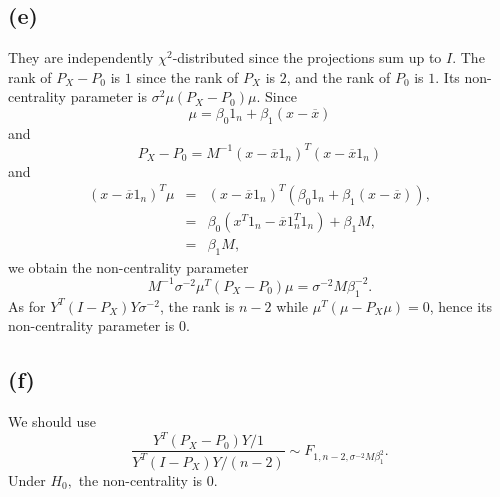 \subsection*{(e)}
They are independently $\chi^{2}$-distributed since the projections
sum up to $I$. The rank of $P_{X}-P_{0}$ is $1$ since the rank
of $P_{X}$ is $2$, and the rank of $P_{0}$ is $1$. Its non-centrality
parameter is $\sigma^{2}\mu(P_{X}-P_{0})\mu$.
Since
\[
\mu=\beta_{0}1_{n}+\beta_{1}(x-\overline{x})
\]
and
\[
P_{X}-P_{0}=M^{-1}(x-\overline{x}1_{n})^{T}(x-\overline{x}1_{n})
\]
and
\begin{eqnarray*}
(x-\overline{x}1_{n})^{T}\mu & = & (x-\overline{x}1_{n})^{T}(\beta_{0}1_{n}+\beta_{1}(x-\overline{x})),\\
 & = & \beta_{0}(x^{T}1_{n}-\overline{x}1_{n}^{T}1_{n})+\beta_{1}M,\\
 & = & \beta_{1}M,
\end{eqnarray*}
we obtain the non-centrality parameter 
\[
M^{-1}\sigma^{-2}\mu^{T}(P_{X}-P_{0})\mu=\sigma^{-2}M\beta_{1}^{-2}.
\]
As for $Y^{T}(I-P_{X})Y\sigma^{-2}$, the rank is $n-2$ while $\mu^{T}(\mu-P_{X}\mu)=0$,
hence its non-centrality parameter is $0$.

\subsection*{(f)}
We should use 
\[
\frac{Y^{T}(P_{X}-P_{0})Y/1}{Y^{T}(I-P_{X})Y/(n-2)}\sim F_{1,n-2,\sigma^{-2}M\beta_{1}^{2}}.
\]
Under $H_{0},$ the non-centrality is $0$.
